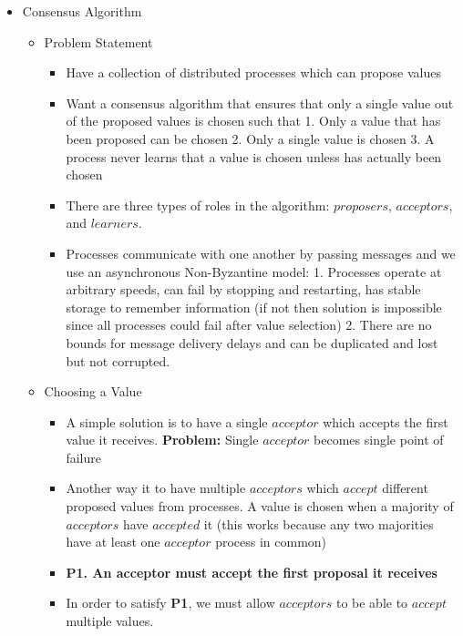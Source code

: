 \documentclass[a4paper]{article}
\begin{document}
\begin{itemize}
\item Consensus Algorithm
\begin{itemize}
\item Problem Statement
\begin{itemize}
\item Have a collection of distributed processes which can propose values

\item Want a consensus algorithm that ensures that only a single value out of the proposed values is chosen such that 1. Only a value that has been proposed can be chosen 2. Only a single value is chosen 3. A process never learns that a value is chosen unless has actually been chosen

\item There are three types of roles in the algorithm: $proposers$, $acceptors$, and $learners$.

\item Processes communicate with one another by passing messages and we use an asynchronous Non-Byzantine model: 1. Processes operate at arbitrary speeds, can fail by stopping and restarting, has stable storage to remember information (if not then solution is impossible since all processes could fail after value selection) 2. There are no bounds for message delivery delays and can be duplicated and lost but not corrupted.

\end{itemize}

\item Choosing a Value
\begin{itemize}
\item A simple solution is to have a single $acceptor$ which accepts the first value it receives. \textbf{Problem:} Single $acceptor$ becomes single point of failure

\item Another way it to have multiple $acceptors$ which $accept$ different proposed values from processes. A value is chosen when a majority of $acceptors$ have $accepted$ it (this works because any two majorities have at least one $acceptor$ process in common)

\item \textbf{P1. An acceptor must accept the first proposal it receives}

\item In order to satisfy \textbf{P1}, we must allow $acceptors$ to be able to $accept$ multiple values. 


\end{itemize}
\end{itemize}
\end{itemize}
\end{document}
